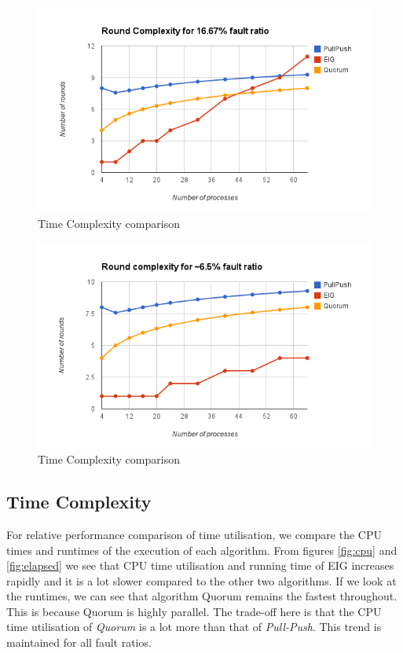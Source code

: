 \begin{figure}[h]
 \centering
\includegraphics[scale=0.4]{Round16}
\caption{Time Complexity comparison}
 \label{fig:round16}
\end{figure}

\begin{figure}[h]
 \centering
\includegraphics[scale=0.4]{Round6}
\caption{Time Complexity comparison}
 \label{fig:round6}
\end{figure}

\subsection{Time Complexity}

For relative performance comparison of time utilisation, we compare the CPU times and runtimes of the execution of each algorithm.  From figures \ref{fig:cpu} and \ref{fig:elapsed} we see that CPU time utilisation and running time of EIG increases rapidly and it is a lot slower compared to the other two algorithms. If we look at the runtimes, we can see that algorithm Quorum remains the fastest throughout. This is because Quorum is highly parallel. The trade-off here is that the CPU time utilisation of \textit{Quorum} is a lot more than that of \textit{Pull-Push}. This trend is maintained for all fault ratios.


